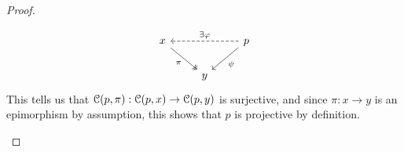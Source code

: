 \begin{proof}
\begin{enumerate}
$$\begin{tikzcd}
                                        	x && p \\
                                        	& y
                                        	\arrow["\pi"', two heads, from=1-1, to=2-2]
                                        	\arrow["\psi", from=1-3, to=2-2]
                                        	\arrow["{\exists \varphi}"', dashed, from=1-3, to=1-1]
                                        \end{tikzcd}
                                    $$
                                This tells us that $\mathcal{C}(p, \pi): \mathcal{C}(p, x) \to \mathcal{C}(p, y)$ is surjective, and since $\pi: x \to y$ is an epimorphism by assumption, this shows that $p$ is projective by definition.
                            \end{enumerate}
                    \end{proof}
                

